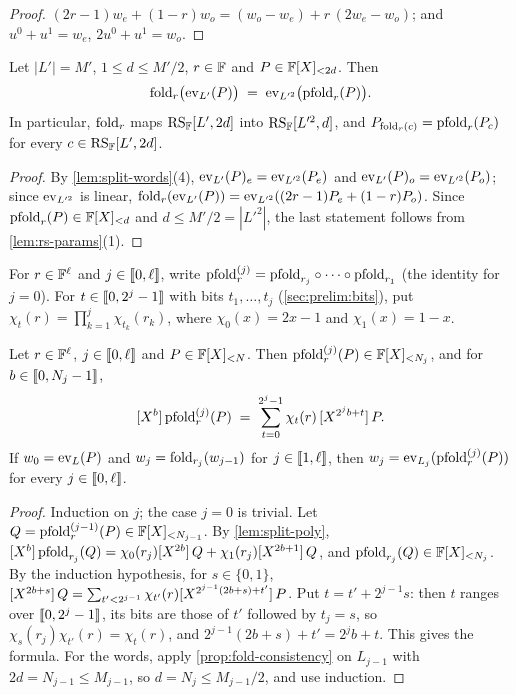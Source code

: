 \begin{proof}
$(2r-1)w_e + (1-r)w_o = (w_o - w_e) + r\,(2w_e - w_o)$; and $u^0 + u^1 = w_e$, $2u^0 + u^1 = w_o$.
\end{proof}

\begin{proposition}\label{prop:fold-consistency}
Let $|L'| = M'$, $1 \le d \le M'/2$, $r \in \mathbb{F}$ and $P \in \mathbb{F}[X]_{<2d}$. Then
\[
  \mathrm{fold}_r\bigl(\mathrm{ev}_{L'}(P)\bigr) \;=\; \mathrm{ev}_{L'^2}\bigl(\mathrm{pfold}_r(P)\bigr).
\]
In particular, $\mathrm{fold}_r$ maps $\mathrm{RS}_{\mathbb{F}}[L',2d]$ into $\mathrm{RS}_{\mathbb{F}}[L'^2,d]$, and $P_{\mathrm{fold}_r(c)} = \mathrm{pfold}_r(P_c)$ for every $c \in \mathrm{RS}_{\mathbb{F}}[L',2d]$.
\end{proposition}

\begin{proof}
By \cref{lem:split-words}(4), $\mathrm{ev}_{L'}(P)_e = \mathrm{ev}_{L'^2}(P_e)$ and $\mathrm{ev}_{L'}(P)_o = \mathrm{ev}_{L'^2}(P_o)$; since $\mathrm{ev}_{L'^2}$ is linear, $\mathrm{fold}_r(\mathrm{ev}_{L'}(P)) = \mathrm{ev}_{L'^2}((2r-1)P_e + (1-r)P_o)$.
Since $\mathrm{pfold}_r(P) \in \mathbb{F}[X]_{<d}$ and $d \le M'/2 = |L'^2|$, the last statement follows from \cref{lem:rs-params}(1).
\end{proof}

For $r \in \mathbb{F}^{\ell}$ and $j \in \llbracket 0, \ell \rrbracket$, write $\mathrm{pfold}^{(j)}_r = \mathrm{pfold}_{r_j} \circ \dots \circ \mathrm{pfold}_{r_1}$ (the identity for $j = 0$).
For $t \in \llbracket 0, 2^j-1 \rrbracket$ with bits $t_1,\dots,t_j$ (\cref{sec:prelim:bits}), put $\chi_t(r) = \prod_{k=1}^{j} \chi_{t_k}(r_k)$, where $\chi_0(x) = 2x-1$ and $\chi_1(x) = 1-x$.

\begin{lemma}\label{lem:iterated}
Let $r \in \mathbb{F}^\ell$, $j \in \llbracket 0, \ell \rrbracket$ and $P \in \mathbb{F}[X]_{<N}$. Then $\mathrm{pfold}^{(j)}_r(P) \in \mathbb{F}[X]_{<N_j}$, and for $b \in \llbracket 0, N_j - 1 \rrbracket$,
\[
  [X^{b}]\,\mathrm{pfold}^{(j)}_r(P) \;=\; \sum_{t=0}^{2^j-1} \chi_t(r)\, [X^{2^j b + t}]\,P.
\]
If $w_0 = \mathrm{ev}_L(P)$ and $w_j = \mathrm{fold}_{r_j}(w_{j-1})$ for $j \in \llbracket 1, \ell \rrbracket$, then $w_j = \mathrm{ev}_{L_j}(\mathrm{pfold}^{(j)}_r(P))$ for every $j \in \llbracket 0, \ell \rrbracket$.
\end{lemma}

\begin{proof}
Induction on $j$; the case $j = 0$ is trivial. Let $Q = \mathrm{pfold}^{(j-1)}_r(P) \in \mathbb{F}[X]_{<N_{j-1}}$. By \cref{lem:split-poly}, $[X^{b}]\,\mathrm{pfold}_{r_j}(Q) = \chi_0(r_j)[X^{2b}]\,Q + \chi_1(r_j)[X^{2b+1}]\,Q$, and $\mathrm{pfold}_{r_j}(Q) \in \mathbb{F}[X]_{<N_j}$.
By the induction hypothesis, for $s \in \{0,1\}$, $[X^{2b+s}]\,Q = \sum_{t' < 2^{j-1}} \chi_{t'}(r)[X^{2^{j-1}(2b+s) + t'}]\,P$.
Put $t = t' + 2^{j-1}s$: then $t$ ranges over $\llbracket 0, 2^j-1 \rrbracket$, its bits are those of $t'$ followed by $t_j = s$, so $\chi_{s}(r_j)\chi_{t'}(r) = \chi_t(r)$, and $2^{j-1}(2b+s) + t' = 2^j b + t$. This gives the formula.
For the words, apply \cref{prop:fold-consistency} on $L_{j-1}$ with $2d = N_{j-1} \le M_{j-1}$, so $d = N_j \le M_{j-1}/2$, and use induction.
\end{proof}

